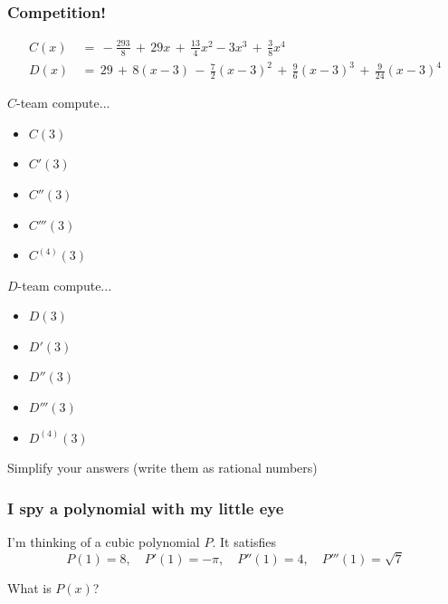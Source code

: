 \begin{frame}[t]
	\frametitle{Competition!}
	\vspace{-.8cm}
	{\fontsize{13}{13}\selectfont \begin{align*}C(x)&\, = \, -\frac{293}{8}\, + \, 29x \, + \, \frac{13}{4}x^{2}-3x^{3}\, + \, \frac{3}{8}x^{4}\phantom{\int}\\ D(x)&\, = \, 29 \, + \, 8(x -3) \, - \, \frac{7}{2}(x-3)^{2}\, + \, \frac{9}{6}(x-3)^{3}\, + \, \frac{9}{24}(x-3)^{4}\end{align*} }
	\vspace{-1cm}

	\begin{multicols}{2}
		$C$-team compute...
		\begin{itemize}
			\item $C(3)$

			\item $C'(3)$

			\item $C''(3)$

			\item $C'''(3)$

			\item $C^{(4)}(3)$
		\end{itemize}

		$D$-team compute...
		\begin{itemize}
			\item $D(3)$

			\item $D'(3)$

			\item $D''(3)$

			\item $D'''(3)$

			\item $D^{(4)}(3)$
		\end{itemize}
	\end{multicols}
	Simplify your answers (write them as rational numbers)
\end{frame}

\begin{frame}[t]
	\frametitle{I spy a polynomial with my little eye}

	I'm thinking of a cubic polynomial $P$. It satisfies
	\[
		P(1)=8, \quad P'(1)=-\pi, \quad P''(1) = 4, \quad P'''(1) = \sqrt{7}
	\]

	What is $P(x)$?
\end{frame}


